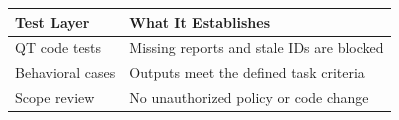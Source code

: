 \begin{tabular}{@{}P{4.0cm}P{8.5cm}@{}}
\toprule
\textbf{Test Layer} & \textbf{What It Establishes} \\
\midrule
QT code tests & Missing reports and stale IDs are blocked \\
Behavioral cases & Outputs meet the defined task criteria \\
Scope review & No unauthorized policy or code change \\
\bottomrule
\end{tabular}
